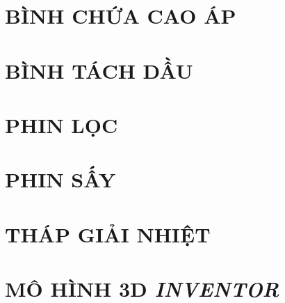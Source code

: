 

\section{BÌNH CHỨA CAO ÁP}


\section{BÌNH TÁCH DẦU}


\section{PHIN LỌC}


\section{PHIN SẤY}


\section{THÁP GIẢI NHIỆT}


\section{MÔ HÌNH 3D \textit{INVENTOR}}



